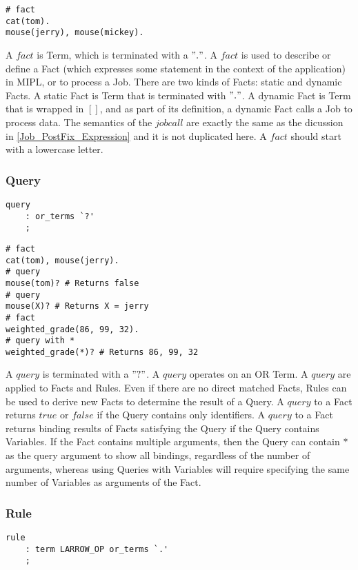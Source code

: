 \documentclass[prodmode,acmtecs]{acmsmall}
\begin{document}
\begin{lstlisting}
# fact
cat(tom).
mouse(jerry), mouse(mickey).
\end{lstlisting}

A $fact$ is Term, which is terminated with a $"."$. A $fact$ is used to
 describe or define a Fact (which expresses some statement in the context
 of the application) in MIPL, or to process a Job. There are two kinds of
 Facts: static and dynamic Facts. A static Fact is Term that is terminated
 with $"."$. A dynamic Fact is Term that is wrapped in $[ ]$, and as part
 of its definition, a dynamic Fact calls a Job to process data. The semantics
 of the $jobcall$ are exactly the same as the dicussion in \ref{Job_PostFix_Expression}
 and it is not duplicated here. A $fact$ should start with a lowercase letter.
\medskip

\subsubsection{Query}
\begin{lstlisting}
query
	: or_terms `?'		
	;
\end{lstlisting}

\begin{lstlisting}
# fact
cat(tom), mouse(jerry).
# query
mouse(tom)? # Returns false
# query
mouse(X)? # Returns X = jerry
# fact
weighted_grade(86, 99, 32).
# query with *
weighted_grade(*)? # Returns 86, 99, 32
\end{lstlisting}

A $query$ is terminated with a $"?"$. A $query$ operates on an OR Term. A $query$ 
 are applied to Facts and Rules. Even if there are no direct matched Facts, Rules
 can be used to derive new Facts to determine the result of a Query. A $query$ to 
 a Fact returns $true$ or $false$ if the Query contains only identifiers. A $query$ 
 to a Fact returns binding results of Facts satisfying the Query if the Query contains 
 Variables. If the Fact contains multiple  arguments, then the Query can contain $*$
 as the query argument to show all bindings, regardless of the number of arguments, 
 whereas using Queries with Variables will require specifying the same number of 
 Variables as arguments of the Fact.
\medskip

\subsubsection{Rule}
\begin{lstlisting}
rule
	: term LARROW_OP or_terms `.'
	;
\end{lstlisting}
\end{document}
